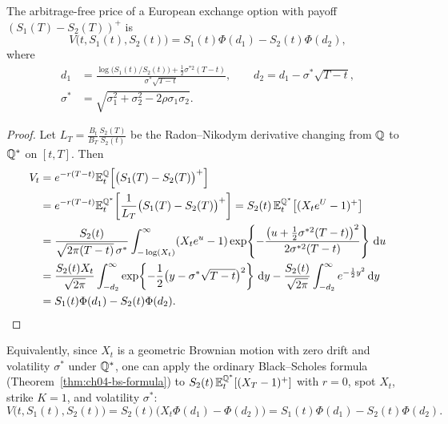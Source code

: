 \begin{theorem}
    \label{thm:ch04-margrabe}
    The arbitrage-free price of a European exchange option with payoff $(S_1(T) - S_2(T))^+$ is
    \[
        V\bigl(t, S_1(t), S_2(t)\bigr) = S_1(t)\Phi(d_1) - S_2(t)\Phi(d_2),
    \]
    where
    \begin{align*}
        d_1 &= \frac{\log\bigl(S_1(t) / S_2(t)\bigr) + \frac{1}{2}\sigma^{*2}(T - t)}{\sigma^*\sqrt{T - t}}, \qquad
        d_2 = d_1 - \sigma^*\sqrt{T - t}, \\
        \sigma^* &= \sqrt{\sigma_1^2 + \sigma_2^2 - 2\rho\sigma_1\sigma_2}.
    \end{align*}
\end{theorem}
\begin{proof}
    Let $L_T = \frac{B_t}{B_T}\frac{S_2(T)}{S_2(t)}$ be the Radon--Nikodym derivative changing from $\mathbb{Q}$ to $\mathbb{Q}^*$ on $[t, T]$. Then
    \begin{align*}
        V_t &= e^{-r(T-t)}\mathbb{E}_t^{\mathbb{Q}}\!\left[\bigl(S_1(T) - S_2(T)\bigr)^+\right] \\
        &= e^{-r(T-t)}\mathbb{E}_t^{\mathbb{Q}^*}\!\left[\frac{1}{L_T}\bigl(S_1(T) - S_2(T)\bigr)^+\right]
        = S_2(t)\,\mathbb{E}_t^{\mathbb{Q}^*}\!\left[(X_t e^U - 1)^+\right] \\
        &= \frac{S_2(t)}{\sqrt{2\pi(T - t)}\,\sigma^*} \int_{-\log(X_t)}^{\infty} (X_t e^u - 1) \exp\!\left\{-\frac{\bigl(u + \frac{1}{2}\sigma^{*2}(T - t)\bigr)^2}{2\sigma^{*2}(T - t)}\right\}\,\mathrm{d} u \\
        &= \frac{S_2(t) X_t}{\sqrt{2\pi}} \int_{-d_2}^{\infty} \exp\!\left\{-\frac{1}{2}\bigl(y - \sigma^*\sqrt{T - t}\bigr)^2\right\}\,\mathrm{d} y
        - \frac{S_2(t)}{\sqrt{2\pi}} \int_{-d_2}^{\infty} e^{-\frac{1}{2}y^2}\,\mathrm{d} y \\
        &= S_1(t)\Phi(d_1) - S_2(t)\Phi(d_2). \qedhere
    \end{align*}
\end{proof}

\begin{note}
    Equivalently, since $X_t$ is a geometric Brownian motion with zero drift and volatility $\sigma^*$ under $\mathbb{Q}^*$, one can apply the ordinary Black--Scholes formula (Theorem~\ref{thm:ch04-bs-formula}) to $S_2(t)\,\mathbb{E}_t^{\mathbb{Q}^*}[(X_T - 1)^+]$ with $r = 0$, spot $X_t$, strike $K = 1$, and volatility $\sigma^*$:
    \[
        V\bigl(t, S_1(t), S_2(t)\bigr) = S_2(t)\bigl(X_t \Phi(d_1) - \Phi(d_2)\bigr) = S_1(t)\Phi(d_1) - S_2(t)\Phi(d_2).
    \]
\end{note}

